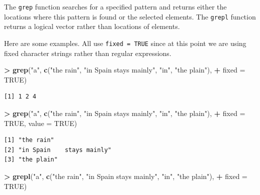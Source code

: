 \documentclass[
]{krantz}
\makeatletter
\newenvironment{Shaded}{\begin{snugshade}}{\end{snugshade}}
\newcommand{\DataTypeTok}[1]{\textcolor[rgb]{0.27,0.27,0.27}{#1}}
\newcommand{\KeywordTok}[1]{\textcolor[rgb]{0.27,0.27,0.27}{\textbf{#1}}}
\newcommand{\NormalTok}[1]{#1}
\newcommand{\OperatorTok}[1]{\textcolor[rgb]{0.43,0.43,0.43}{\textbf{#1}}}
\newcommand{\OtherTok}[1]{\textcolor[rgb]{0.37,0.37,0.37}{#1}}
\newcommand{\StringTok}[1]{\textcolor[rgb]{0.5,0.5,0.5}{#1}}
\newenvironment{kframe}{%
\medskip{}
\setlength{\fboxsep}{.8em}
 \def\at@end@of@kframe{}%
 \ifinner\ifhmode%
  \def\at@end@of@kframe{\end{minipage}}%
  \begin{minipage}{\columnwidth}%
 \fi\fi%
 \def\FrameCommand##1{\hskip\@totalleftmargin \hskip-\fboxsep
 \colorbox{shadecolor}{##1}\hskip-\fboxsep
     \hskip-\linewidth \hskip-\@totalleftmargin \hskip\columnwidth}%
 \MakeFramed {\advance\hsize-\width
   \@totalleftmargin\z@ \linewidth\hsize
   \@setminipage}}%
 {\par\unskip\endMakeFramed%
 \at@end@of@kframe}
\renewenvironment{Shaded}{\begin{kframe}}{\end{kframe}}
\makeatother
\begin{document}
The \texttt{grep} function searches for a specified pattern and returns either the locations where this pattern is found or the selected elements. The \texttt{grepl} function returns a logical vector rather than locations of elements.

Here are some examples. All use \texttt{fixed\ =\ TRUE} since at this point we are using fixed character strings rather than regular expressions.

\begin{Shaded}
\begin{Highlighting}[]
\OperatorTok{\textgreater{}}\StringTok{ }\KeywordTok{grep}\NormalTok{(}\StringTok{"a"}\NormalTok{, }\KeywordTok{c}\NormalTok{(}\StringTok{"the rain"}\NormalTok{, }\StringTok{"in Spain    stays mainly"}\NormalTok{, }\StringTok{"in"}\NormalTok{, }\StringTok{"the plain"}\NormalTok{), }
\OperatorTok{+}\StringTok{      }\DataTypeTok{fixed =} \OtherTok{TRUE}\NormalTok{)}
\end{Highlighting}
\end{Shaded}

\begin{verbatim}
[1] 1 2 4
\end{verbatim}

\begin{Shaded}
\begin{Highlighting}[]
\OperatorTok{\textgreater{}}\StringTok{ }\KeywordTok{grep}\NormalTok{(}\StringTok{"a"}\NormalTok{, }\KeywordTok{c}\NormalTok{(}\StringTok{"the rain"}\NormalTok{, }\StringTok{"in Spain    stays mainly"}\NormalTok{, }\StringTok{"in"}\NormalTok{, }\StringTok{"the plain"}\NormalTok{), }
\OperatorTok{+}\StringTok{      }\DataTypeTok{fixed =} \OtherTok{TRUE}\NormalTok{, }\DataTypeTok{value =} \OtherTok{TRUE}\NormalTok{)}
\end{Highlighting}
\end{Shaded}

\begin{verbatim}
[1] "the rain"                
[2] "in Spain    stays mainly"
[3] "the plain"               
\end{verbatim}

\begin{Shaded}
\begin{Highlighting}[]
\OperatorTok{\textgreater{}}\StringTok{ }\KeywordTok{grepl}\NormalTok{(}\StringTok{"a"}\NormalTok{, }\KeywordTok{c}\NormalTok{(}\StringTok{"the rain"}\NormalTok{, }\StringTok{"in Spain    stays mainly"}\NormalTok{, }\StringTok{"in"}\NormalTok{, }\StringTok{"the plain"}\NormalTok{), }
\OperatorTok{+}\StringTok{       }\DataTypeTok{fixed =} \OtherTok{TRUE}\NormalTok{)}
\end{Highlighting}
\end{Shaded}
\end{document}
